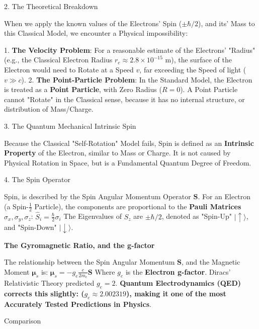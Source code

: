 \documentclass[a4paper, 10pt, onepage]{elegantbook}
\begin{document}
{    2. The Theoretical Breakdown  

\noindent

When we apply the known values of the Electrons' Spin ($\pm \hbar/2$), and its' Mass to this Classical Model, we 
encounter a Physical impossibility:  

    1.  \textbf{The Velocity Problem}: For a reasonable estimate of the Electrons' "Radius" (e.g., the Classical 
Electron Radius $r_e \approx 2.8 \times 10^{-15}$ m), the surface of the Electron would need to Rotate at a Speed $v$, 
far exceeding the Speed of light ($v \gg c$).  
    2.  \textbf{The Point-Particle Problem}: In the Standard Model, the Electron is treated as a \textbf{Point 
Particle}, with Zero Radius ($R=0$). A Point Particle cannot "Rotate" in the Classical sense, because it has no 
internal structure, or distribution of Mass/Charge.  

    3. The Quantum Mechanical Intrinsic Spin  

\noindent

Because the Classical "Self-Rotation" Model fails, Spin is defined as an \textbf{Intrinsic Property} of the Electron, 
similar to Mass or Charge. It is not caused by Physical Rotation in Space, but is a Fundamental Quantum Degree of 
Freedom.  

    4. The Spin Operator  

\noindent

Spin, is described by the Spin Angular Momentum Operator $\mathbf{S}$. For an Electron (a Spin-$\frac{1}{2}$ Particle), 
the components are proportional to the \textbf{Pauli Matrices} $\sigma_x, \sigma_y, \sigma_z$:  
$ \hat{S}_i = \frac{\hbar}{2} \sigma_i $  
The Eigenvalues of $\hat{S}_z$ are $\pm \hbar/2$, denoted as "Spin-Up" $|\uparrow\rangle$, and "Spin-Down" 
$|\downarrow\rangle$.  

     \textbf{The Gyromagnetic Ratio, and the g-factor}  

The relationship between the Spin Angular Momentum $\mathbf{S}$, and the Magnetic Moment $\boldsymbol{\mu}_s$ is:  
$ \boldsymbol{\mu}_s = -g_e \frac{e}{2m_e} \mathbf{S} $  
Where $g_e$ is the \textbf{Electron g-factor}.   
  Diracs' Relativistic Theory predicted $g_e = 2$.  
  \textbf{Quantum Electrodynamics (QED) corrects this slightly: ($g_e \approx 2.002319$), making it one of the most 
Accurately Tested Predictions in Physics}.

\noindent

     Comparison  

\noindent

}
\end{document}
